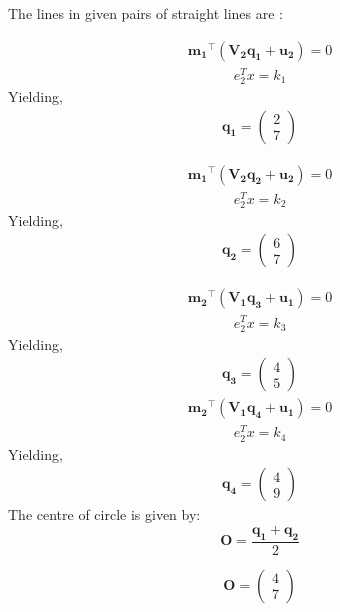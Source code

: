 \documentclass[journal,10pt,twocolumn]{article}
\providecommand{\brak}[1]{\ensuremath{\left(#1\right)}}
\newcommand{\myvec}[1]{\ensuremath{\begin{pmatrix}#1\end{pmatrix}}}
\let\vec\mathbf
\begin{document}
 
 \vspace{4mm}
The lines in given pairs of straight lines are :

\begin{align}
\vec{m_1}^{\top}\brak{\vec{V_2}\vec{q_1}+\vec{u_2}} = 0
\end{align}
\begin{align}
		e_2^Tx=k_1	
\end{align}
            Yielding,
           \begin{align}
\vec{q_1}=\myvec{2\\7}
\end{align}
            
\begin{align}
\vec{m_1}^{\top}\brak{\vec{V_2}\vec{q_2}+\vec{u_2}} = 0
\end{align}
\begin{align}
		e_2^Tx=k_2	
		\end{align}
		Yielding,
		\begin{align}
\vec{q_2}=\myvec{6\\7}
\end{align}

\begin{align}
\vec{m_2}^{\top}\brak{\vec{V_1}\vec{q_3}+\vec{u_1}} = 0
\end{align}
\begin{align}
		e_2^Tx=k_3
\end{align}
Yielding,
\begin{align}
\vec{q_3}=\myvec{4\\5}
\end{align}
\begin{align}
\vec{m_2}^{\top}\brak{\vec{V_1}\vec{q_4}+\vec{u_1}} = 0
\end{align}
\begin{align}
e_2^Tx=k_4
\end{align}
Yielding,
\begin{align}
\vec{q_4}=\myvec{4\\9}
\end{align}
  The centre of circle is given by:
     \begin{equation}
     \vec{O}=\frac{\vec{q_1}+\vec{q_2}}{2}
          \end{equation}
        
        \begin{equation*}
        \vec{O}=\myvec{4\\7}
\end{equation*}          
    
\end{document}
